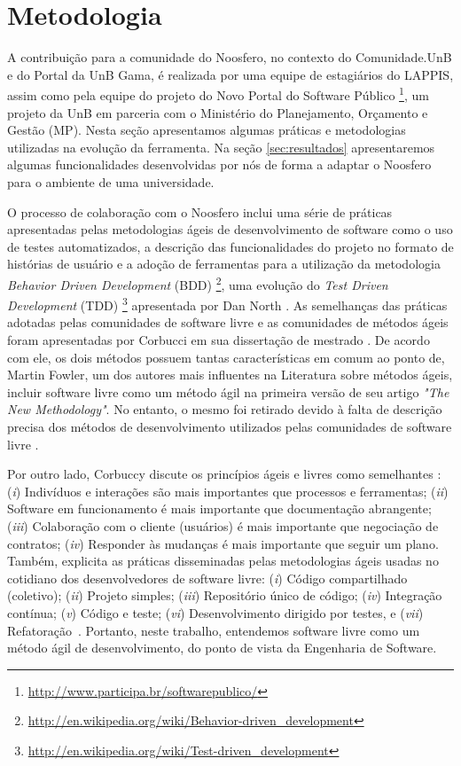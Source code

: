 \section{Metodologia}
\label{sec:metodologia}

A contribuição para a comunidade do Noosfero, no contexto do Comunidade.UnB e
do Portal da UnB Gama, é realizada por uma equipe de estagiários do LAPPIS,
assim como pela equipe do projeto do Novo Portal do Software Público%
\footnote{\url{http://www.participa.br/softwarepublico/}}, um projeto da UnB
em parceria com o Ministério do Planejamento, Orçamento e Gestão (MP). Nesta
seção apresentamos algumas práticas e metodologias utilizadas na evolução da
ferramenta. Na seção \ref{sec:resultados} apresentaremos
algumas funcionalidades desenvolvidas por nós de forma a adaptar o Noosfero
para o ambiente de uma universidade.

O processo de colaboração com o Noosfero inclui uma série de práticas apresentadas
pelas metodologias ágeis de desenvolvimento de software como o uso de testes
automatizados, a descrição das funcionalidades do projeto no formato de
histórias de usuário e a adoção de ferramentas para a utilização da metodologia
\textit{Behavior Driven Development} (BDD)%
\footnote{\url{http://en.wikipedia.org/wiki/Behavior-driven_development}},
uma evolução do \textit{Test Driven Development} (TDD)%
\footnote{\url{http://en.wikipedia.org/wiki/Test-driven_development}}
apresentada por Dan North \cite{north2006}.
%
As semelhanças das práticas adotadas pelas comunidades de software livre e as
comunidades de métodos ágeis foram apresentadas por Corbucci
em sua dissertação de mestrado \cite{corbucci2011}. De acordo com ele, os dois
métodos possuem tantas características em comum ao ponto de, Martin Fowler,
um dos autores mais influentes na Literatura sobre métodos ágeis,
incluir software livre como um método ágil na primeira versão de seu artigo
\textit{"The New Methodology"}. No entanto, o mesmo foi retirado devido
à falta de descrição precisa dos métodos de desenvolvimento utilizados pelas
comunidades de software livre \cite{fowler2000}.

Por outro lado, Corbuccy discute os princípios ágeis e livres
como semelhantes \cite{corbucci2011} :
%
(\textit{i}) Indivíduos e interações são mais importantes que processos e
ferramentas;
(\textit{ii}) Software em funcionamento é mais importante que documentação
abrangente;
(\textit{iii}) Colaboração com o cliente (usuários) é mais importante que
negociação de contratos;
(\textit{iv}) Responder às mudanças é mais importante que seguir um plano.
%
Também, explicita as práticas disseminadas pelas metodologias ágeis usadas no
cotidiano dos desenvolvedores de software livre:
(\textit{i}) Código compartilhado (coletivo);
(\textit{ii}) Projeto simples;
(\textit{iii}) Repositório único de código;
(\textit{iv}) Integração contínua;
(\textit{v}) Código e teste;
(\textit{vi}) Desenvolvimento dirigido por testes, e
(\textit{vii}) Refatoração~\cite{corbucci2011}. Portanto, neste trabalho,
entendemos software livre como um método ágil de desenvolvimento, do ponto de
vista da Engenharia de Software.

